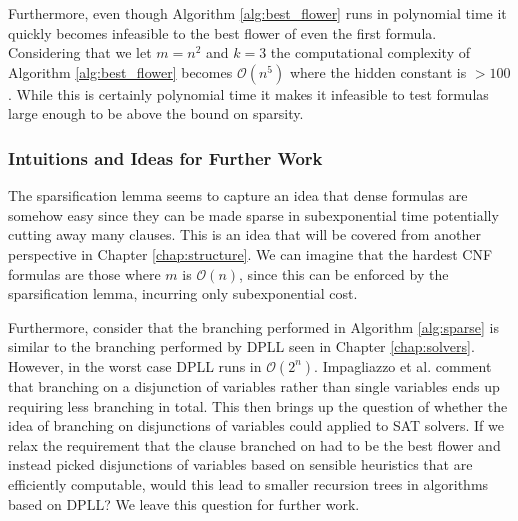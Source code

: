 Furthermore, even though Algorithm \ref{alg:best_flower} runs in polynomial time it quickly becomes infeasible
to the best flower of even the first formula. Considering that we let $m = n^2$ and $k=3$ the computational
complexity of Algorithm \ref{alg:best_flower} becomes $\mathcal{O}(n^5)$ where the hidden constant is $>100$.
While this is certainly polynomial time it makes it infeasible to test formulas large enough to be above
the bound on sparsity.

\subsubsection{Intuitions and Ideas for Further Work}
The sparsification lemma seems to capture an idea that dense formulas are somehow easy
since they can be made sparse in subexponential time potentially cutting away many clauses.
This is an idea that will be covered from another perspective in Chapter \ref{chap:structure}.
We can imagine that the hardest CNF formulas are those where $m$ is $\mathcal{O}(n)$, since
this can be enforced by the sparsification lemma, incurring only subexponential cost.

Furthermore, consider that the branching performed in Algorithm \ref{alg:sparse} is similar
to the branching performed by DPLL seen in Chapter \ref{chap:solvers}. However, in the worst case
DPLL runs in $\mathcal{O}(2^n)$. Impagliazzo et al. \cite{impagliazzo2001problems} comment
that branching on a disjunction of variables rather than single variables ends up requiring less
branching in total. This then brings up the question of whether the idea of branching on disjunctions
of variables could applied to SAT solvers. If we relax the requirement that the clause branched on
had to be the best flower and instead picked disjunctions of variables based on sensible heuristics that are efficiently computable,
would this lead to smaller recursion trees in algorithms based on DPLL? We leave this question for further work.